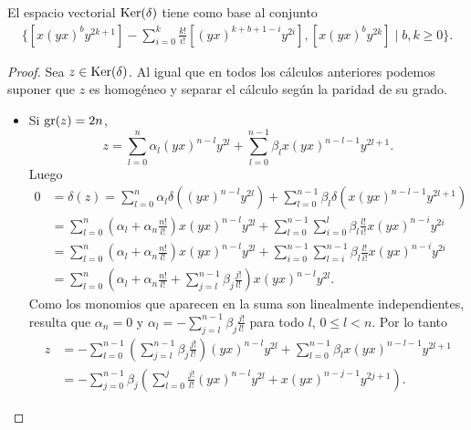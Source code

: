 \documentclass[fleqn,../tesis.tex]{subfiles}
\begin{document}
\begin{prop}
El espacio vectorial $\operatorname{Ker}(\delta)$ tiene como base al conjunto
\begin{align*}
    \Bigg\lbrace \left[x(yx)^{b}y^{2k + 1}\right] - \sum_{i = 0}^k \frac{k!}{i!}\left[(yx)^{k + b + 1 - i}y^{2i}\right],
    \left[x(yx)^{b}y^{2k}\right] \mid b, k \geq 0\Bigg\rbrace.
\end{align*}
\end{prop}
\begin{proof}
    Sea $z \in \operatorname{Ker}(\delta)$. Al igual que en todos los cálculos anteriores podemos suponer que $z$ es homogéneo y separar
    el cálculo según la paridad de su grado.
    \begin{itemize}
        \item Si $\operatorname{gr}(z) = 2n$,
            \[
                z= \sum_{l = 0}^{n}\alpha_l(yx)^{n - l}y^{2l}  +\sum_{l = 0}^{n - 1}\beta_l x(yx)^{n - l - 1}y^{2l + 1}.            
            \]
         Luego
         \begin{align*}
             0 &= \delta(z) = \sum_{l = 0}^{n}\alpha_l\delta\left((yx)^{n - l}y^{2l}\right) 
                 +\sum_{l = 0}^{n - 1}\beta_l \delta\left(x(yx)^{n - l - 1}y^{2l + 1}\right)\\
             &= \sum_{l = 0}^{n}\left( \alpha_l + \alpha_n \frac{n!}{l!} \right) x(yx)^{n - l}y^{2l}
                 + \sum_{l = 0}^{n - 1}\sum_{i = 0}^{l}\beta_l \frac{l!}{i!} x(yx)^{n - i}y^{2i} \\
             &= \sum_{l = 0}^{n}\left( \alpha_l + \alpha_n \frac{n!}{l!} \right) x(yx)^{n - l}y^{2l}
                 + \sum_{i = 0}^{n - 1}\sum_{l = i}^{n - 1}\beta_l\frac{l!}{i!} x(yx)^{n - i}y^{2i} \\
             &= \sum_{l = 0}^{n}\left(\alpha_l + \alpha_n \frac{n!}{l!} + \sum_{j = l}^{n - 1}\beta_j \frac{j!}{l!}\right)x(yx)^{n - l}y^{2l}.
         \end{align*}
         Como los monomios que aparecen en la suma son linealmente independientes, resulta que $\alpha_n = 0$
         y $\alpha_l = -\sum_{j = l}^{n - 1}\beta_j \frac{j!}{l!}$ para todo $l$, $0 \leq l < n$. Por lo tanto
            \begin{align*}
                z&= -\sum_{l = 0}^{n - 1}\left(\sum_{j = l}^{n - 1}\beta_j \frac{j!}{l!}\right)(yx)^{n - l}y^{2l} 
                    +\sum_{l = 0}^{n - 1}\beta_l x(yx)^{n - l - 1}y^{2l + 1}\\
                 &= -\sum_{j = 0}^{n - 1}\beta_j \left(\sum_{l = 0} ^{j}\frac{j!}{l!}(yx)^{n -l}y^{2l} + x(yx)^{n - j - 1}y^{2j + 1}\right).

\end{align*}
\end{itemize}
\end{proof}
\end{document}
